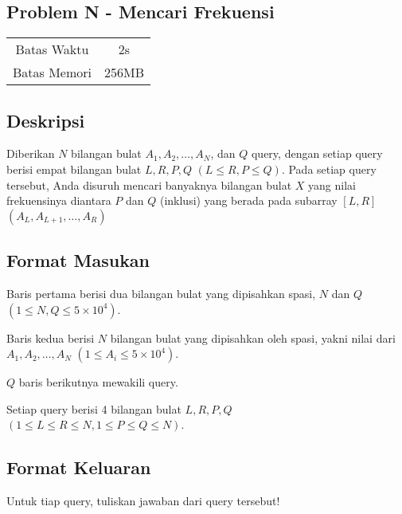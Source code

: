 \documentclass{article}
\begin{document}
\begin{center}
    \section*{Problem N - Mencari Frekuensi} %

    \begin{tabular}{ | c c | }
        \hline
        Batas Waktu  & 2s \\    %
        Batas Memori & 256MB \\  %
        \hline
    \end{tabular}
\end{center}

\subsection*{Deskripsi}

Diberikan $N$ bilangan bulat $A_1, A_2, \dots, A_N$, dan $Q$ query, dengan setiap query berisi empat bilangan bulat $L, R, P, Q$ $(L \leq R, P \leq Q)$. Pada setiap query tersebut, Anda disuruh mencari banyaknya bilangan bulat $X$ yang nilai frekuensinya diantara $P$ dan $Q$ (inklusi) yang berada pada subarray $[L, R]$ $(A_L, A_{L + 1}, \dots, A_R)$

\subsection*{Format Masukan}

Baris pertama berisi dua bilangan bulat yang dipisahkan spasi, $N$ dan $Q$ $(1 \leq N, Q \leq 5 \times 10^4)$.

Baris kedua berisi $N$ bilangan bulat yang dipisahkan oleh spasi, yakni nilai dari $A_1, A_2, \dots, A_N$ $(1 \leq A_i \leq 5 \times 10^4)$.

$Q$ baris berikutnya mewakili query.

Setiap query berisi 4 bilangan bulat $L, R, P, Q$  $(1 \leq L \leq R \leq N, 1 \leq P \leq Q \leq N)$.

\subsection*{Format Keluaran}

Untuk tiap query, tuliskan jawaban dari query tersebut!
\end{document}
